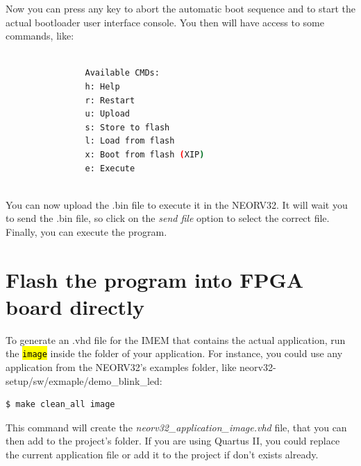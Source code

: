         Now you can press any key to abort the automatic boot sequence and to start the actual bootloader user interface console. You then will have access to some commands, like:
        
            \begin{lstlisting}[backgroundcolor = \color{lightgray}, language=bash]
            
                Available CMDs:
                h: Help
                r: Restart
                u: Upload
                s: Store to flash
                l: Load from flash
                x: Boot from flash (XIP)
                e: Execute
                 
            \end{lstlisting}
        
        You can now upload the .bin file to execute it in the NEORV32. It will wait you to send the .bin file, so click on the \textit{send file} option to select the correct file. Finally, you can execute the program.
        
    \section{Flash the program into FPGA board directly}
        
        To generate an .vhd file for the IMEM that contains the actual application, run the \texttt{\hl{image}} inside the folder of your application. For instance, you could use any application from the NEORV32's examples folder, like neorv32-setup/sw/exmaple/demo\_blink\_led:
        
            \begin{lstlisting}[backgroundcolor = \color{lightgray}, language=bash]
                $ make clean_all image
            \end{lstlisting}
        
        This command will create the \textit{neorv32\_application\_image.vhd} file, that you can then add to the project's folder. If you are using Quartus II, you could replace the current application file or add it to the project if don't exists already.